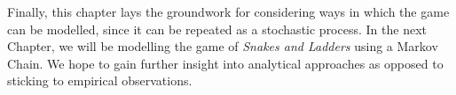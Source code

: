 Finally, this chapter lays the groundwork for considering ways in which the game can be modelled, since it can be repeated as a stochastic process. In the next Chapter, we will be modelling the game of \textit{Snakes and Ladders} using a Markov Chain. We hope to gain further insight into analytical approaches as opposed to sticking to empirical observations. 




